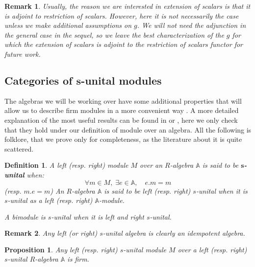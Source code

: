 \documentclass[a4paper,fleqn]{cas-sc}
\newtheorem{prop}[thm]{Proposition}%
\newtheorem{rem}{Remark}%
\newtheorem{dfnt}{Definition}%
\newcommand{\bA}{\mathbb{A}}
\begin{document}
\begin{rem}
Usually, the reason we are interested in extension of scalars is that it is adjoint to restriction of scalars. 
However, here it is not necessarily the case unless we make additional assumptions on $g$. We will not need the adjunction in the general case in the sequel, so we leave the best characterization of the $g$ for which the extension of scalars is adjoint to the restriction of scalars functor for future work. 
\end{rem}

\subsection{Categories of $\mathbf{s}$-unital modules}

The algebras we will be working over have some additional properties that will allow us to describe firm modules in a more convenient way 
. A more detailed explanation of the most useful results can be found in \cite{thfmn} or \cite{tominaga,Komatsu}, here we only check that they hold under our definition of module over an algebra. All the following is folklore, that we prove only for completeness, as the literature about it is quite scattered.

\begin{dfnt}
A left (resp. right) module $M$ over an $R$-algebra $\bA$ is said to be $\mathbf{s}$\textbf{-unital} when:
\[
\forall m \in M, \; \exists e \in \bA, \quad
e.m = m
\]
(resp. $m.e = m$)
An $R$-algebra $\bA$ is said to be left (resp. right) $s$-unital when it is $s$-unital as a left (resp. right) $\bA$-module.

A bimodule is $s$-unital when it is left and right $s$-unital.
\end{dfnt}

\begin{rem}
Any left (or right) $s$-unital algebra is clearly an idempotent algebra.
\end{rem}

\begin{prop}
Any left (resp. right) $s$-unital module $M$ over a left (resp. right) $s$-unital $R$-algebra $\bA$ is firm.
\end{prop}
\end{document}
